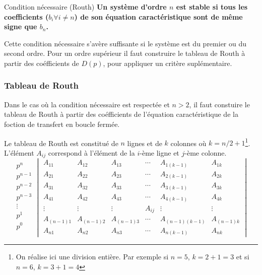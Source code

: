 \begin{criteria}{Condition nécessaire (Routh)}
    \textbf{Un système d'ordre $n$ est stable si tous les coefficients ($b_i\forall i\neq n$) 
    de son équation caractéristique sont de même signe que $b_n$.}
\end{criteria}

Cette condition nécessaire s'avère suffisante si le système est du premier ou du second ordre.
Pour un ordre supérieur il faut construire le tableau de Routh à partir des coéfficients de $D(p)$,
pour appliquer un critère suplémentaire. 

\subsubsection{Tableau de Routh}
Dans le cas où la condition nécessaire est respectée et $n>2$, il faut constuire le tableau de Routh à partir 
des coéfficients de l'équation caractéristique de la foction de transfert en boucle fermée.

Le tableau de Routh est constitué de $n$ lignes et de $k$ colonnes 
où $k=n/2+1$\footnote{On réalise ici une division entière. Par exemple 
si $n=5$, $k=2+1=3$ et si $n=6$, $k=3+1=4$}. L'élément $A_{ij}$ correspond 
à l'élément de la $i$-ème ligne et $j$-ème colonne.
\[
\begin{matrix}
    p^n    \\
    p^{n-1}\\
    p^{n-2}\\
    p^{n-3}\\
    \vdots \\
    p^1    \\
    p^0    \\
\end{matrix}
\begin{vmatrix}
    A_{11}     & A_{12}     & A_{13}     & \cdots & A_{1(k-1)}     & A_{1k}      \\
    A_{21}     & A_{22}     & A_{23}     & \cdots & A_{2(k-1)}     & A_{2k}      \\
    A_{31}     & A_{32}     & A_{33}     & \cdots & A_{3(k-1)}     & A_{3k}      \\
    A_{41}     & A_{42}     & A_{43}     & \cdots & A_{4(k-1)}     & A_{4k}      \\
    \vdots     & \vdots     & \vdots     & A_{ij} & \vdots         & \vdots      \\
    A_{(n-1)1} & A_{(n-1)2} & A_{(n-1)3} & \cdots & A_{(n-1)(k-1)} & A_{(n-1)k}  \\
    A_{n1}     & A_{n2}     & A_{n3}     & \cdots & A_{n(k-1)}     & A_{nk}
\end{vmatrix}
\]

